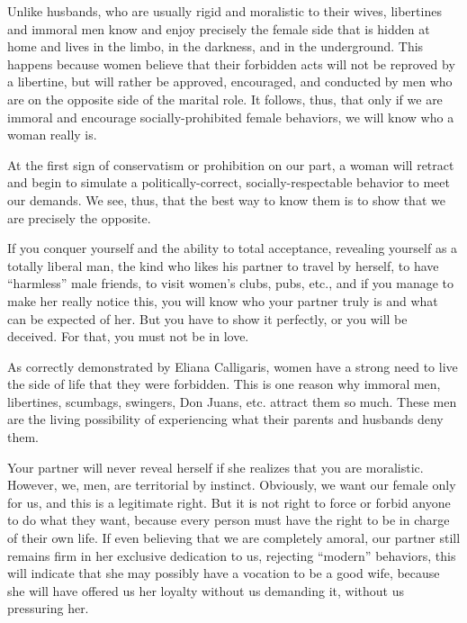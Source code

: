 \par Unlike husbands, who are usually rigid and moralistic to their wives, libertines and immoral men know and enjoy precisely the female side that is hidden at home and lives in the limbo, in the darkness, and in the underground. This happens because women believe that their forbidden acts will not be reproved by a libertine, but will rather be approved, encouraged, and conducted by men who are on the opposite side of the marital role. It follows, thus, that only if we are immoral and encourage socially-prohibited female behaviors, we will know who a woman really is.

\par At the first sign of conservatism or prohibition on our part, a woman will retract and begin to simulate a politically-correct, socially-respectable behavior to meet our demands. We see, thus, that the best way to know them is to show that we are precisely the opposite.

\par If you conquer yourself and the ability to total acceptance, revealing yourself as a totally liberal man, the kind who likes his partner to travel by herself, to have \enquote{harmless} male friends, to visit women's clubs, pubs, etc., and if you manage to make her really notice this, you will know who your partner truly is and what can be expected of her. But you have to show it perfectly, or you will be deceived. For that, you must not be in love.

\par As correctly demonstrated by Eliana Calligaris, women have a strong need to live the side of life that they were forbidden. This is one reason why immoral men, libertines, scumbags, swingers, Don Juans, etc. attract them so much. These men are the living possibility of experiencing what their parents and husbands deny them.

\par Your partner will never reveal herself if she realizes that you are moralistic. However, we, men, are territorial by instinct. Obviously, we want our female only for us, and this is a legitimate right. But it is not right to force or forbid anyone to do what they want, because every person must have the right to be in charge of their own life. If even believing that we are completely amoral, our partner still remains firm in her exclusive dedication to us, rejecting \enquote{modern} behaviors, this will indicate that she may possibly have a vocation to be a good wife, because she will have offered us her loyalty without us demanding it, without us pressuring her.

